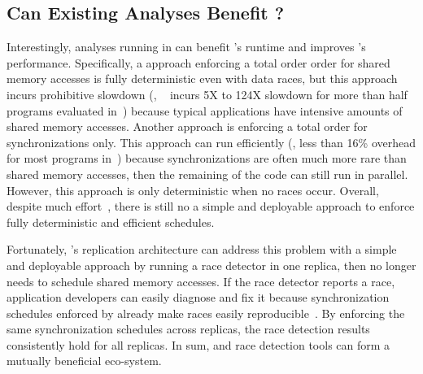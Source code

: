 \subsection{Can Existing Analyses Benefit \xxx?} 
\label{sec:strengthen-crane}

Interestingly, analyses running in \xxx can benefit \xxx's \dmt runtime and 
improves \xxx's performance. Specifically, a \dmt approach enforcing a total 
order order for shared memory accesses is fully deterministic even with data 
races, but this approach incurs prohibitive slowdown (\eg, 
\dthreads~\cite{dthreads:sosp11} incurs 5X to 124X slowdown for more than half 
programs evaluated in~\cite{parrot:sosp13}) because typical applications have 
intensive amounts of shared memory accesses. Another \dmt approach is enforcing 
a total order for synchronizations only. This approach can run efficiently 
(\eg, less than 16\% overhead for most programs in~\cite{kendo:asplos09, 
cui:tern:osdi10, parrot:sosp13}) because synchronizations are often much more 
rare than shared memory accesses, then the remaining of the code can still run 
in parallel. However, this \dmt approach is only deterministic when no races 
occur. Overall, despite much effort~\cite{dthreads:sosp11, peregrine:sosp11, 
determinator:osdi10}, there is still no a simple and deployable approach to 
enforce fully deterministic and efficient \dmt schedules.


Fortunately, \xxx's replication architecture can address this problem with a 
simple and deployable approach by running a race detector in one replica, then 
\dmt no longer needs to schedule shared memory accesses. If the race 
detector reports a race, application developers can easily diagnose and fix it 
because synchronization schedules enforced by \dmt already make races easily 
reproducible~\cite{pres:sosp09}. By enforcing the same synchronization 
schedules across replicas, the race detection results consistently hold for all 
replicas. In sum, \xxx and race detection tools can form a mutually beneficial 
eco-system.
